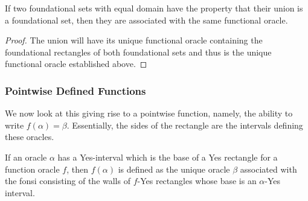 \documentclass[12pt]{article}
\begin{document}
\begin{corollary}
    If two foundational sets with equal domain have the property that their union is a foundational set, then they are associated with the same functional oracle. 
\end{corollary}

\begin{proof}
    The union will have its unique functional oracle containing the foundational rectangles of both foundational sets and thus is the unique functional oracle established above. 
\end{proof}


\subsubsection{Pointwise Defined Functions}

We now look at this giving rise to a pointwise function, namely, the ability to write $f(\alpha) = \beta$. Essentially, the sides of the rectangle are the intervals defining these oracles.  

\begin{proposition}
If an oracle $\alpha$ has a Yes-interval which is the base of a Yes rectangle for a function oracle $f$, then $f(\alpha)$ is defined as the unique oracle $\beta$ associated with the fonsi consisting of the walls of $f$-Yes rectangles whose base is an $\alpha$-Yes interval. 
\end{proposition}
\end{document}
